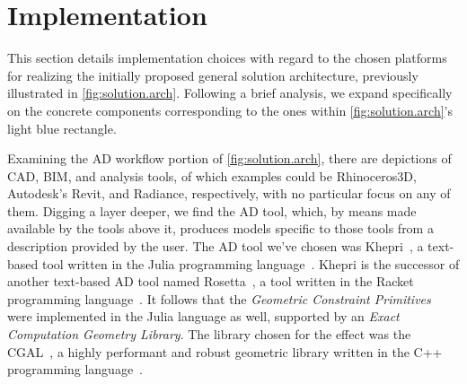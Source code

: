 \section{Implementation}%
\label{sec:solution.impl}

This section details implementation choices with regard to the chosen platforms
for realizing the initially proposed general solution architecture, previously
illustrated in \cref{fig:solution.arch}. Following a brief analysis, we expand
specifically on the concrete components corresponding to the ones within
\cref{fig:solution.arch}'s light blue rectangle.

Examining the \ac{AD} workflow portion of \cref{fig:solution.arch}, there are
depictions of \ac{CAD}, \ac{BIM}, and analysis tools, of which examples could be
Rhinoceros3D, Autodesk's Revit, and Radiance, respectively, with no particular
focus on any of them.  Digging a layer deeper, we find the \ac{AD} tool, which,
by means made available by the tools above it, produces models specific to those
tools from a description provided by the user.  The \ac{AD} tool we've chosen
was Khepri~\cite{Leitao:2018:Khepri.jl,Leitao:2019:GRUGEAV}, a text-based tool
written in the Julia programming language~\cite{Bezanson:2017:JAFANC}.  Khepri
is the successor of another text-based \ac{AD} tool named
Rosetta~\cite{Leitao:2011:PGDCAD}, a tool written in the Racket programming
language~\cite{PLT:2010:Reference}.  It follows that the \textit{Geometric
Constraint Primitives} were implemented in the Julia language as well, supported
by an \textit{Exact Computation Geometry Library}.  The library chosen for the
effect was the \acf{CGAL}~\cite{CGAL:2018}, a highly performant and robust
geometric library written in the C++ programming
language~\cite{Stroustrup:2013:CPP}.

